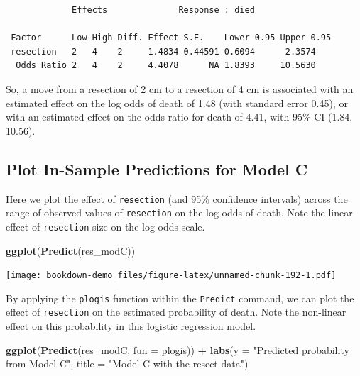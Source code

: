 \documentclass[]{book}
\newenvironment{Shaded}{\begin{snugshade}}{\end{snugshade}}
\newcommand{\KeywordTok}[1]{\textcolor[rgb]{0.13,0.29,0.53}{\textbf{#1}}}
\newcommand{\DataTypeTok}[1]{\textcolor[rgb]{0.13,0.29,0.53}{#1}}
\newcommand{\StringTok}[1]{\textcolor[rgb]{0.31,0.60,0.02}{#1}}
\newcommand{\OperatorTok}[1]{\textcolor[rgb]{0.81,0.36,0.00}{\textbf{#1}}}
\newcommand{\NormalTok}[1]{#1}
\theoremstyle{definition}
\theoremstyle{definition}
\theoremstyle{definition}
\theoremstyle{remark}
\begin{document}
\begin{verbatim}
             Effects              Response : died 

 Factor      Low High Diff. Effect S.E.    Lower 0.95 Upper 0.95
 resection   2   4    2     1.4834 0.44591 0.6094      2.3574   
  Odds Ratio 2   4    2     4.4078      NA 1.8393     10.5630   
\end{verbatim}

So, a move from a resection of 2 cm to a resection of 4 cm is associated
with an estimated effect on the log odds of death of 1.48 (with standard
error 0.45), or with an estimated effect on the odds ratio for death of
4.41, with 95\% CI (1.84, 10.56).

\subsection{Plot In-Sample Predictions for Model
C}\label{plot-in-sample-predictions-for-model-c}

Here we plot the effect of \texttt{resection} (and 95\% confidence
intervals) across the range of observed values of \texttt{resection} on
the log odds of death. Note the linear effect of \texttt{resection} size
on the log odds scale.

\begin{Shaded}
\begin{Highlighting}[]
\KeywordTok{ggplot}\NormalTok{(}\KeywordTok{Predict}\NormalTok{(res_modC))}
\end{Highlighting}
\end{Shaded}

\texttt{[image: bookdown-demo\_files/figure-latex/unnamed-chunk-192-1.pdf]}

By applying the \texttt{plogis} function within the \texttt{Predict}
command, we can plot the effect of \texttt{resection} on the estimated
probability of death. Note the non-linear effect on this probability in
this logistic regression model.

\begin{Shaded}
\begin{Highlighting}[]
\KeywordTok{ggplot}\NormalTok{(}\KeywordTok{Predict}\NormalTok{(res_modC, }\DataTypeTok{fun =}\NormalTok{ plogis)) }\OperatorTok{+}\StringTok{ }
\StringTok{    }\KeywordTok{labs}\NormalTok{(}\DataTypeTok{y =} \StringTok{"Predicted probability from Model C"}\NormalTok{,}
         \DataTypeTok{title =} \StringTok{"Model C with the resect data"}\NormalTok{)}
\end{Highlighting}
\end{Shaded}
\end{document}

